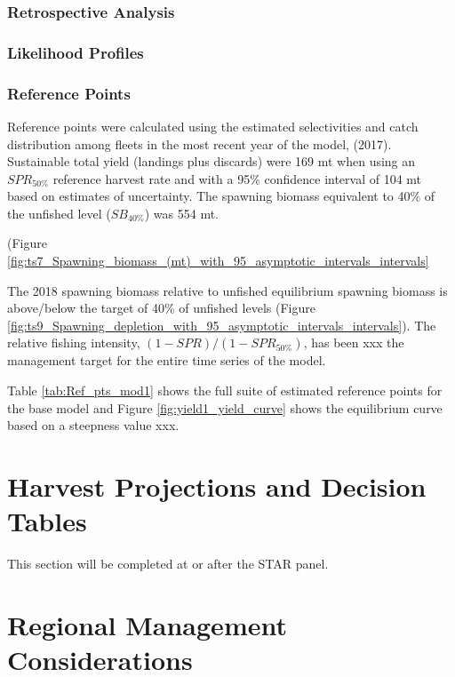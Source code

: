 \documentclass[12pt,]{article}
\begin{document}
\subsubsection{Retrospective Analysis}\label{retrospective-analysis}

\subsubsection{Likelihood Profiles}\label{likelihood-profiles}

\subsubsection{Reference Points}\label{reference-points-1}

Reference points were calculated using the estimated selectivities and
catch distribution among fleets in the most recent year of the model,
(2017). Sustainable total yield (landings plus discards) were 169 mt
when using an \(SPR_{50\%}\) reference harvest rate and with a 95\%
confidence interval of 104 mt based on estimates of uncertainty. The
spawning biomass equivalent to 40\% of the unfished level
(\(SB_{40\%}\)) was 554 mt.

(Figure
\ref{fig:ts7_Spawning_biomass_(mt)_with_95_asymptotic_intervals_intervals}

The 2018 spawning biomass relative to unfished equilibrium spawning
biomass is above/below the target of 40\% of unfished levels (Figure
\ref{fig:ts9_Spawning_depletion_with_95_asymptotic_intervals_intervals}).
The relative fishing intensity, \((1-SPR)/(1-SPR_{50\%})\), has been xxx
the management target for the entire time series of the model.

Table \ref{tab:Ref_pts_mod1} shows the full suite of estimated reference
points for the base model and Figure \ref{fig:yield1_yield_curve} shows
the equilibrium curve based on a steepness value xxx.

\section{Harvest Projections and Decision
Tables}\label{harvest-projections-and-decision-tables}

This section will be completed at or after the STAR panel.

\section{Regional Management
Considerations}\label{regional-management-considerations}
\end{document}
